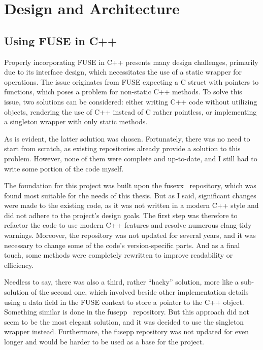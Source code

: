 \chapter{Design and Architecture}
\label{chap:design-and-architecture}


\section{Using FUSE in C++}\label{sec:fuse-in-cpp}

Properly incorporating FUSE in C++ presents many design challenges, primarily due to its interface design, which necessitates the use of a static wrapper for operations.
The issue originates from FUSE expecting a C struct with pointers to functions, which poses a problem for non-static C++ methods.
To solve this issue, two solutions can be considered: either writing C++ code without utilizing objects, rendering the use of C++ instead of C rather pointless, or implementing a singleton wrapper with only static methods.

As is evident, the latter solution was chosen.
Fortunately, there was no need to start from scratch, as existing repositories already provide a solution to this problem.
However, none of them were complete and up-to-date, and I still had to write some portion of the code myself.

The foundation for this project was built upon the fusexx~\cite{fusexx} repository, which was found most suitable for the needs of this thesis.
But as I said, significant changes were made to the existing code, as it was not written in a modern C++ style and did not adhere to the project's design goals.
The first step was therefore to refactor the code to use modern C++ features and resolve numerous clang-tidy warnings.
Moreover, the repository was not updated for several years, and it was necessary to change some of the code's version-specific parts.
And as a final touch, some methods were completely rewritten to improve readability or efficiency.

Needless to say, there was also a third, rather ``hacky'' solution, more like a sub-solution of the second one, which involved beside other implementation details using a data field in the FUSE context to store a pointer to the C++ object.
Something similar is done in the fusepp~\cite{fusepp} repository.
But this approach did not seem to be the most elegant solution, and it was decided to use the singleton wrapper instead.
Furthermore, the fusepp repository was not updated for even longer and would be harder to be used as a base for the project.


